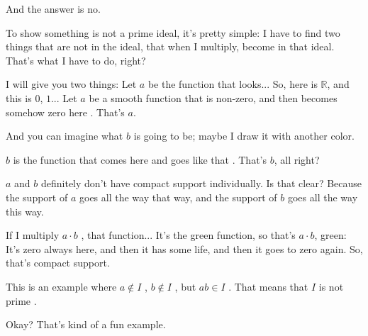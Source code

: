\begin{speech}[01:05:24 - 01:07:17]
And the answer is no.

To show something is not a prime ideal, it's pretty simple: I have to find two things that are not in the ideal, that when I multiply, become in that ideal. That's what I have to do, right?

I will give you two things: Let $a$ be the function that looks... So, here is $\mathbb{R}$, and this is $0$, $1$... Let $a$ be a smooth function that is non-zero, and then becomes somehow zero here . That's $a$.

And you can imagine what $b$ is going to be; maybe I draw it with another color.

$b$ is the function that comes here and goes like that . That's $b$, all right?

$a$ and $b$ definitely don't have compact support individually. Is that clear? Because the support of $a$ goes all the way that way, and the support of $b$ goes all the way this way.

If I multiply $a \cdot b$ , that function... It's the green function, so that's $a \cdot b$, green: It's zero always here, and then it has some life, and then it goes to zero again. So, that's compact support.

This is an example where $a \notin I$ , $b \notin I$ , but $ab \in I$ . That means that $I$ is not prime .

Okay? That's kind of a fun example.
\end{speech}

